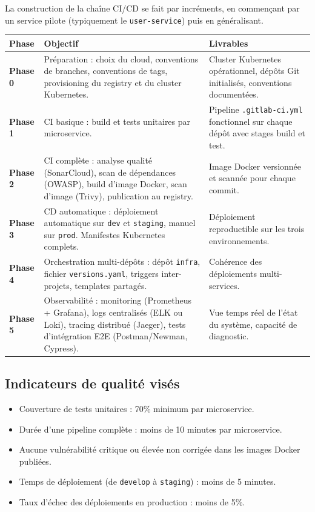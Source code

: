 \documentclass[12pt,a4paper]{article}
\begin{document}
La construction de la chaîne CI/CD se fait par incréments, en commençant par un service pilote (typiquement le \texttt{user-service}) puis en généralisant.

\renewcommand{\arraystretch}{1.4}
\begin{longtable}{>{\bfseries\color{primary}}p{1.7cm} p{6cm} p{6cm}}
    \toprule
    \textbf{\color{primary}Phase} & \textbf{\color{primary}Objectif} & \textbf{\color{primary}Livrables} \\
    \midrule
    \endhead

    Phase 0 & Préparation : choix du cloud, conventions de branches, conventions de tags, provisioning du registry et du cluster Kubernetes. & Cluster Kubernetes opérationnel, dépôts Git initialisés, conventions documentées. \\
    \rowcolor{lightgray}
    Phase 1 & CI basique : build et tests unitaires par microservice. & Pipeline \texttt{.gitlab-ci.yml} fonctionnel sur chaque dépôt avec stages build et test. \\
    Phase 2 & CI complète : analyse qualité (SonarCloud), scan de dépendances (OWASP), build d'image Docker, scan d'image (Trivy), publication au registry. & Image Docker versionnée et scannée pour chaque commit. \\
    \rowcolor{lightgray}
    Phase 3 & CD automatique : déploiement automatique sur \texttt{dev} et \texttt{staging}, manuel sur \texttt{prod}. Manifestes Kubernetes complets. & Déploiement reproductible sur les trois environnements. \\
    Phase 4 & Orchestration multi-dépôts : dépôt \texttt{infra}, fichier \texttt{versions.yaml}, triggers inter-projets, templates partagés. & Cohérence des déploiements multi-services. \\
    \rowcolor{lightgray}
    Phase 5 & Observabilité : monitoring (Prometheus + Grafana), logs centralisés (ELK ou Loki), tracing distribué (Jaeger), tests d'intégration E2E (Postman/Newman, Cypress). & Vue temps réel de l'état du système, capacité de diagnostic. \\
    \bottomrule
\end{longtable}

\subsection{Indicateurs de qualité visés}

\begin{itemize}[leftmargin=*,itemsep=4pt]
    \item Couverture de tests unitaires : 70\% minimum par microservice.
    \item Durée d'une pipeline complète : moins de 10 minutes par microservice.
    \item Aucune vulnérabilité critique ou élevée non corrigée dans les images Docker publiées.
    \item Temps de déploiement (de \texttt{develop} à \texttt{staging}) : moins de 5 minutes.
    \item Taux d'échec des déploiements en production : moins de 5\%.
\end{itemize}
\end{document}
